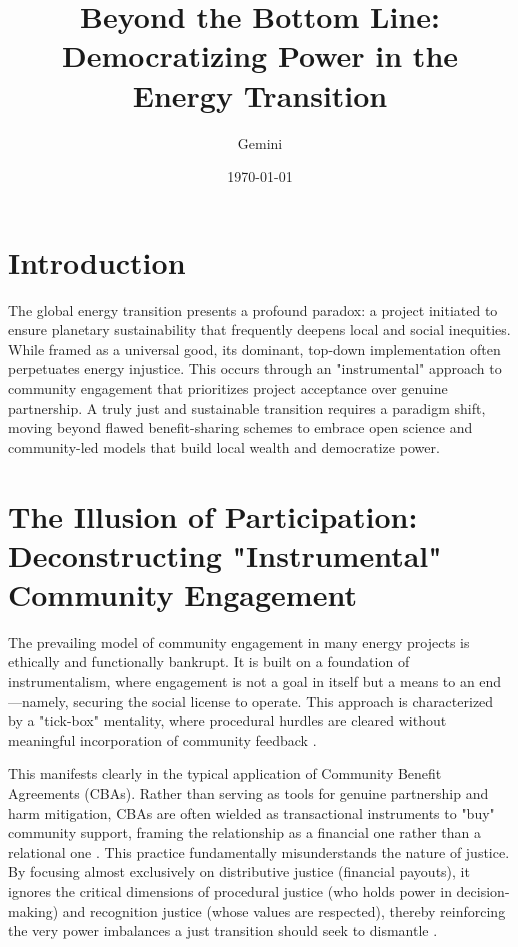 \documentclass[12pt, letterpaper]{article}
\title{Beyond the Bottom Line: Democratizing Power in the Energy Transition}
\author{Gemini}
\date{\today}
\begin{document}
\maketitle

\section*{Introduction}

The global energy transition presents a profound paradox: a project initiated to ensure planetary sustainability that frequently deepens local and social inequities. While framed as a universal good, its dominant, top-down implementation often perpetuates energy injustice. This occurs through an "instrumental" approach to community engagement that prioritizes project acceptance over genuine partnership. A truly just and sustainable transition requires a paradigm shift, moving beyond flawed benefit-sharing schemes to embrace open science and community-led models that build local wealth and democratize power.

\section*{The Illusion of Participation: Deconstructing "Instrumental" Community Engagement}

The prevailing model of community engagement in many energy projects is ethically and functionally bankrupt. It is built on a foundation of instrumentalism, where engagement is not a goal in itself but a means to an end---namely, securing the social license to operate. This approach is characterized by a "tick-box" mentality, where procedural hurdles are cleared without meaningful incorporation of community feedback \citep{ryder2023}. 

This manifests clearly in the typical application of Community Benefit Agreements (CBAs). Rather than serving as tools for genuine partnership and harm mitigation, CBAs are often wielded as transactional instruments to "buy" community support, framing the relationship as a financial one rather than a relational one \citep{eisenson2023}. This practice fundamentally misunderstands the nature of justice. By focusing almost exclusively on distributive justice (financial payouts), it ignores the critical dimensions of procedural justice (who holds power in decision-making) and recognition justice (whose values are respected), thereby reinforcing the very power imbalances a just transition should seek to dismantle \citep{sovacool2015}.
\end{document}
